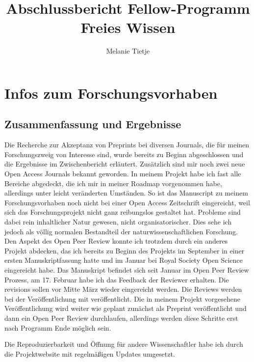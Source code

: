 \documentclass[11pt,a4paper]{article}
\begin{document}
\title{Abschlussbericht Fellow-Programm Freies Wissen}
\author{Melanie Tietje}
\maketitle


\section{Infos zum Forschungsvorhaben}%
\subsection{Zusammenfassung und Ergebnisse} %
Die Recherche zur Akzeptanz von Preprints bei diversen Journals, die für meinen Forschungszweig von Interesse sind, wurde bereits zu Beginn abgeschlossen und die Ergebnisse im Zwischenbericht erläutert. Zusätzlich sind mir noch zwei neue Open Access Journals bekannt geworden.
In meinem Projekt habe ich fast alle Bereiche abgedeckt, die ich mir in meiner Roadmap vorgenommen habe, allerdings unter leicht veränderten Umständen. So ist das Manuscript zu meinem Forschungsvorhaben noch nicht bei einer Open Access Zeitschrift eingereicht, weil sich das Forschungsprojekt nicht ganz reibungslos gestaltet hat. Probleme sind dabei rein inhaltlicher Natur gewesen, nicht organisatorischer. Dies sehe ich jedoch als völlig normalen Bestandteil der naturwissenschaftlichen Forschung. Den Aspekt des Open Peer Review konnte ich trotzdem durch ein anderes Projekt abdecken, das ich bereits zu Beginn des Projekts im September in einer ersten Manuskriptfassung hatte und im Januar bei Royal Society Open Science eingereicht habe. Das Manuskript befindet sich seit Januar im Open Peer Review Prozess, am 17. Februar habe ich das Feedback der Reviewer erhalten. Die revisions sollen vor Mitte März wieder eingereicht werden. Die Reviews werden bei der Veröffentlichung mit veröffentlicht. Die in meinem Projekt vorgesehene Veröffentlichung wird weiter wie geplant zunächst als Preprint veröffentlicht und dann ein Open Peer Review durchlaufen, allerdings werden diese Schritte erst nach Programm Ende möglich sein.

Die Reproduzierbarkeit und Öffnung für andere Wissenschaftler habe ich durch die Projektwebsite mit regelmäßigen Updates umgesetzt.
\end{document}

